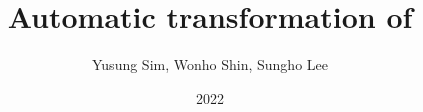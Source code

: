 \documentclass{beamer}
\title{Automatic transformation of }
\author{Yusung Sim, Wonho Shin, Sungho Lee}
\institute{KAIST PLRG}
\date{2022}
\begin{document}
\frame{\titlepage}
\end{document}
